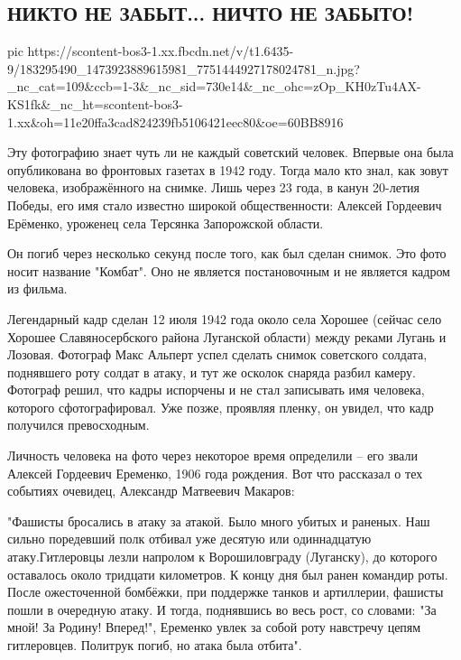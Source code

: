  
 
 
 
 

\subsection{НИКТО НЕ ЗАБЫТ...  НИЧТО НЕ ЗАБЫТО!}

\ifcmt
  pic https://scontent-bos3-1.xx.fbcdn.net/v/t1.6435-9/183295490_1473923889615981_7751444927178024781_n.jpg?_nc_cat=109&ccb=1-3&_nc_sid=730e14&_nc_ohc=zOp_KH0zTu4AX-KS1fk&_nc_ht=scontent-bos3-1.xx&oh=11e20ffa3cad824239fb5106421eec80&oe=60BB8916
\fi

Эту фотографию знает чуть ли не каждый советский человек. Впервые она была
опубликована во фронтовых газетах в 1942 году. Тогда мало кто знал, как зовут
человека, изображённого на снимке. Лишь через 23 года, в канун 20-летия Победы,
его имя стало известно широкой общественности: Алексей Гордеевич Ерёменко,
уроженец села Терсянка Запорожской области.

Он погиб через несколько секунд после того, как был сделан снимок. Это фото
носит название "Комбат". Оно не является постановочным и не является кадром из
фильма.

Легендарный кадр сделан 12 июля 1942 года около села Хорошее (сейчас село
Хорошее Славяносербского района Луганской области) между реками Лугань и
Лозовая. Фотограф Макс Альперт успел сделать снимок советского солдата,
поднявшего роту солдат в атаку, и тут же осколок снаряда разбил камеру.
Фотограф решил, что кадры испорчены и не стал записывать имя человека, которого
сфотографировал. Уже позже, проявляя пленку, он увидел, что кадр получился
превосходным.

Личность человека на фото через некоторое время определили – его звали Алексей
Гордеевич Еременко, 1906 года рождения. Вот что рассказал о тех событиях
очевидец, Александр Матвеевич Макаров:

"Фашисты бросались в атаку за атакой. Было много убитых и раненых. Наш сильно
поредевший полк отбивал уже десятую или одиннадцатую атаку.Гитлеровцы лезли
напролом к Ворошиловграду (Луганску), до которого оставалось около тридцати
километров. К концу дня был ранен командир роты. После ожесточенной бомбёжки,
при поддержке танков и артиллерии, фашисты пошли в очередную атаку. И тогда,
поднявшись во весь рост, со словами: "За мной! За Родину! Вперед!", Еременко
увлек за собой роту навстречу цепям гитлеровцев. Политрук погиб, но атака была
отбита".

